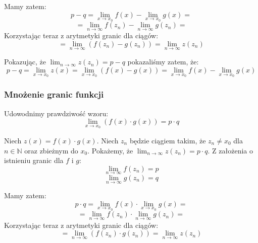 \documentclass{article}
\begin{document}
Mamy zatem:
\begin{equation*}
    p - q = \lim_{x \to x_0} f(x) - \lim_{x \to x_0} g(x) = 
\end{equation*}
\begin{equation*}
    = \lim_{n \to \infty} f(z_n) - \lim_{n \to \infty} g(z_n) =
\end{equation*}
Korzystając teraz z arytmetyki granic dla ciągów:
\begin{equation*}
    = \lim_{n \to \infty} (f(z_n) - g(z_n)) = \lim_{n \to \infty} z(z_n)
\end{equation*}

Pokazując, że \(\lim_{n \to \infty} z(z_n) = p - q\) pokazaliśmy zatem, że:
\begin{equation*}
    p - q = \lim_{x \to x_0} z(x) = \lim_{x \to x_0} (f(x) - g(x)) = \lim_{x \to x_0} f(x) - \lim_{x \to x_0} g(x)
\end{equation*}

\subsubsection{Mnożenie granic funkcji}

Udowodnimy prawdziwość wzoru: 
\begin{equation*}
    \lim_{x \to x_0}(f(x) \cdot g(x)) = p \cdot q
\end{equation*}

Niech \(z(x) = f(x) \cdot g(x)\). Niech \(z_n\) będzie ciągiem takim, że \(z_n \neq x_0\) dla \(n \in \mathbb{N}\) oraz zbieżnym do \(x_0\).
Pokażemy, że \(\lim_{n \to \infty} z(z_n) = p \cdot q\). Z założenia o istnieniu granic dla \(f\) i \(g\):
\begin{equation*}
    \lim_{n \to \infty} f(z_n) = p
\end{equation*}
\begin{equation*}
    \lim_{n \to \infty} g(z_n) = q
\end{equation*}

Mamy zatem:
\begin{equation*}
    p \cdot q = \lim_{x \to x_0} f(x) \cdot \lim_{x \to x_0} g(x) = 
\end{equation*}
\begin{equation*}
    = \lim_{n \to \infty} f(z_n) \cdot \lim_{n \to \infty} g(z_n) =
\end{equation*}
Korzystając teraz z arytmetyki granic dla ciągów:
\begin{equation*}
    = \lim_{n \to \infty} (f(z_n) \cdot g(z_n)) = \lim_{n \to \infty} z(z_n)
\end{equation*}
\end{document}

